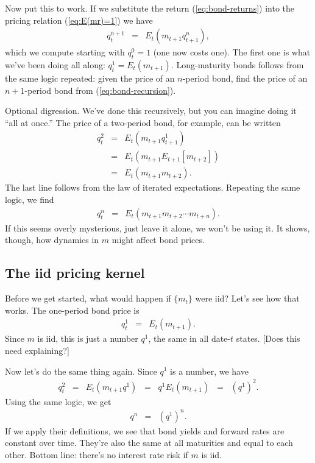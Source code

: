\documentclass[11pt]{article}
\begin{document}
Now put this to work.  If we substitute the return (\ref{eq:bond-returns})
into the pricing relation (\ref{eq:E(mr)=1}) we have
\begin{eqnarray}
    q^{n+1}_t &=& E_t \left( m_{t+1} q^n_{t+1} \right) ,
    \label{eq:bond-recursion}
\end{eqnarray}
which we compute starting with $q^0_t = 1$ (one now costs one).
The first one is what we've been doing all along:
$ q^1_t = E_t (m_{t+1}) $.
Long-maturity bonds follows from the same logic repeated:
given the price of an $n$-period bond,
find the price of an $n+1$-period bond from (\ref{eq:bond-recursion}).

Optional digression.
We've done this recursively, but you can imagine doing it ``all at once.''
The price of a two-period bond, for example, can be written
\begin{eqnarray*}
    q^{2}_t &=& E_t \left( m_{t+1} q^1_{t+1} \right) \\
            &=& E_t \left( m_{t+1} E_{t+1} [m_{t+2}] \right) \\
            &=& E_t \left( m_{t+1} m_{t+2} \right) .
\end{eqnarray*}
The last line follows from the law of iterated expectations.
Repeating the same logic, we find
\begin{eqnarray*}
    q^{n}_t  &=& E_t \left( m_{t+1} m_{t+2} \cdots m_{t+n} \right) .
\end{eqnarray*}
If this seems overly mysterious, just leave it alone,
we won't be using it.
It shows, though, how dynamics in $m$ might affect bond prices.



\subsection*{The iid pricing kernel}

Before we get started, what would happen if $\{ m_t \}$ were iid?
Let's see how that works.
The one-period bond price is
\begin{eqnarray*}
    q^{1}_t &=& E_t \left( m_{t+1} \right) .
\end{eqnarray*}
Since $m$ is iid, this is just a number $q^1$,
the same in all date-$t$ states.
[Does this need explaining?]



Now let's do the same thing again.
Since $q^1 $ is a number, we have
\begin{eqnarray*}
    q^{2}_t &=& E_t \left( m_{t+1} q^1 \right)
            \;\;=\;\;  q^1 E_t \left( m_{t+1}  \right)
            \;\;=\;\;  (q^1)^2 .
\end{eqnarray*}
Using the same logic, we get
\begin{eqnarray*}
    q^{n} &=& (q^1)^n .
\end{eqnarray*}
If we apply their definitions,
we see that bond yields and forward rates are constant over time.
They're also the same at all maturities and equal to each other.
Bottom line:  there's no interest rate risk if $m$ is iid.
\end{document}

